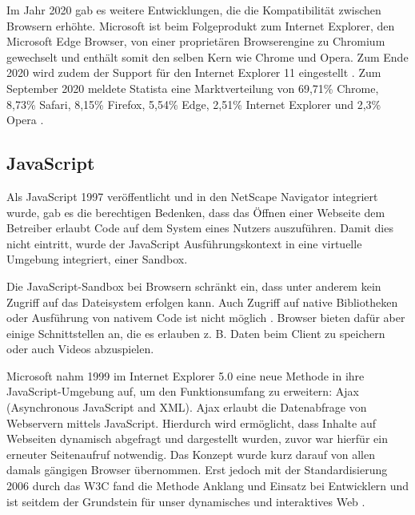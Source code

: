 Im Jahr 2020 gab es weitere Entwicklungen, die die Kompatibilität zwischen Browsern erhöhte. Microsoft ist beim Folgeprodukt zum Internet Explorer, den Microsoft Edge Browser, von einer proprietären Browserengine zu Chromium gewechselt \cite{MicrosoftEdgeChromium} und enthält somit den selben Kern wie Chrome und Opera. Zum Ende 2020 wird zudem der Support für den Internet Explorer 11 eingestellt \cite{MicrosoftInternetExplorerDeprecation}. Zum September 2020 meldete Statista eine Marktverteilung von 69,71\% Chrome, 8,73\% Safari, 8,15\% Firefox, 5,54\% Edge, 2,51\% Internet Explorer und 2,3\% Opera \cite{StatistaBrowserMarketshare}.

\subsection{JavaScript}

Als JavaScript 1997 veröffentlicht und in den NetScape Navigator integriert wurde, gab es die berechtigen Bedenken, dass das Öffnen einer Webseite dem Betreiber erlaubt Code auf dem System eines Nutzers auszuführen. Damit dies nicht eintritt, wurde der JavaScript Ausführungskontext in eine virtuelle Umgebung integriert, einer Sandbox. \cite{LearningJavaScript}

Die JavaScript-Sandbox bei Browsern schränkt ein, dass unter anderem kein Zugriff auf das Dateisystem erfolgen kann. Auch Zugriff auf native Bibliotheken oder Ausführung von nativem Code ist nicht möglich \cite{TheSpyInTheSandbox}. Browser bieten dafür aber einige Schnittstellen an, die es erlauben z. B. Daten beim Client zu speichern oder auch Videos abzuspielen.


Microsoft nahm 1999 im Internet Explorer 5.0 eine neue Methode in ihre JavaScript-Umgebung auf, um den Funktionsumfang zu erweitern: Ajax (Asynchronous JavaScript and XML). Ajax erlaubt die Datenabfrage von Webservern mittels JavaScript. Hierdurch wird ermöglicht, dass Inhalte auf Webseiten dynamisch abgefragt und dargestellt wurden, zuvor war hierfür ein erneuter Seitenaufruf notwendig. Das Konzept wurde kurz darauf von allen damals gängigen Browser übernommen. Erst jedoch mit der Standardisierung 2006 durch das W3C \cite{TheXMLHttpRequestObject} fand die Methode Anklang und Einsatz bei Entwicklern und ist seitdem der Grundstein für unser dynamisches und interaktives Web \cite{TheStoryOfXMLHTTP}.

